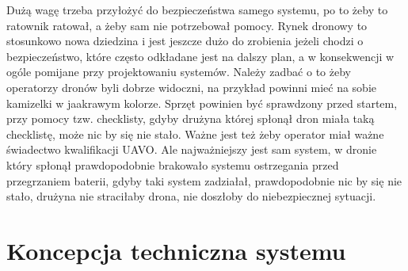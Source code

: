 Dużą wagę trzeba przyłożyć do bezpieczeństwa samego systemu, po to żeby to ratownik ratował, a żeby sam nie potrzebował pomocy. Rynek dronowy to stosunkowo nowa dziedzina i jest jeszcze dużo do zrobienia jeżeli chodzi o bezpieczeństwo, które często odkładane jest na dalszy plan, a w konsekwencji w ogóle pomijane przy projektowaniu systemów. Należy zadbać o to żeby operatorzy dronów byli dobrze widoczni, na przykład powinni mieć na sobie kamizelki w jaakrawym kolorze. Sprzęt powinien być sprawdzony przed startem, przy pomocy tzw. checklisty, gdyby drużyna której spłonął dron miała taką checklistę, może nic by się nie stało. Ważne jest też żeby operator miał ważne świadectwo kwalifikacji UAVO. Ale najważniejszy jest sam system, w dronie który spłonął prawdopodobnie brakowało systemu ostrzegania przed przegrzaniem baterii, gdyby taki system zadziałał, prawdopodobnie nic by się nie stało, drużyna nie straciłaby drona, nie doszłoby do niebezpiecznej sytuacji.

\section{Koncepcja techniczna systemu}

